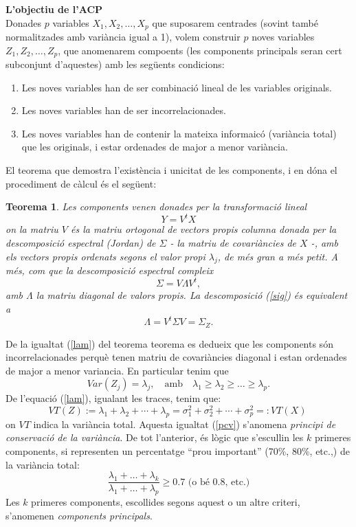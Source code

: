 \documentclass[english]{article}
\newtheorem{theorem}{Teorema}
\begin{document}
\noindent\textbf{L'objectiu de l'ACP}\\
Donades $p$ variables $X_1,X_2, \ldots,X_p$ que suposarem centrades
(sovint també normalitzades amb variància igual a 1), volem
construir $p$ noves variables $Z_1,Z_2, \ldots,Z_p$, que anomenarem
compoents (les components principals seran cert subconjunt
d'aquestes) amb les següents condicions:
\begin{enumerate}
 \item Les noves variables han de ser combinació lineal de les
 variables originals.
 \item Les noves variables han de ser incorrelacionades.
 \item Les noves variables han de contenir la mateixa informaicó (variància
 total) que les originals, i estar ordenades de major a menor
 variància.
\end{enumerate}
El teorema que demostra l'existència i unicitat de les components, i
en dóna el procediment de càlcul és el següent:


\begin{theorem}
Les components  venen donades per la transformació lineal
$$Y =V^tX$$
on la matriu $V$ és la matriu ortogonal de vectors propis columna
donada per la descomposició espectral (Jordan) de $\Sigma$ - la
matriu de covariàncies de $X$ -, amb els vectors propis ordenats
segons el valor propi $\lambda_j$, de més gran a més petit. A més,
com que la descomposició espectral compleix
\begin{equation}
\Sigma=V\Lambda
V^t, \label{sig}
\end{equation}
amb $\Lambda$ la matriu diagonal de
valors propis. La descomposició (\ref{sig}) és equivalent a
\begin{equation}
\Lambda=V^t\Sigma V=\Sigma_Z.
\label{lam}
\end{equation}
\end{theorem}

De la igualtat (\ref{lam}) del teorema teorema es dedueix que les
components són incorrelacionades perquè tenen matriu de covariàncies
diagonal i estan ordenades de major a menor variancia. En particular
tenim que
$$Var (Z_j ) = \lambda_j,\quad\mbox{amb}\quad \lambda_1\geq\lambda_2\geq \ldots \geq \lambda_p.$$
De l'equació  (\ref{lam}), igualant les traces, tenim que:
\begin{equation}
 VT(Z):= \lambda_1+\lambda_2+\cdots + \lambda_p=\sigma_1^2 +\sigma_2^2+\cdots + \sigma_p^2=: VT(X)\ \label{pcv}
\end{equation}
on $VT$ indica la variància total. Aquesta igualtat (\ref{pcv})
s'anomena \emph{principi de conservació de la variància}.
\clearpage
De tot l'anterior, és lògic que s'escullin les $k$ primeres
components, si representen un percentatge ``prou important'' (70\%,
80\%, etc.,) de la variància total: $$
\frac{\lambda_1+\ldots+\lambda_k}{\lambda_1+\ldots+\lambda_p} \geq
0.7  \mbox{ (o bé 0.8, etc.)}
$$
Les $k$ primeres components, escollides segons aquest o un altre
criteri, s'anomenen \emph{components principals}.
\end{document}
